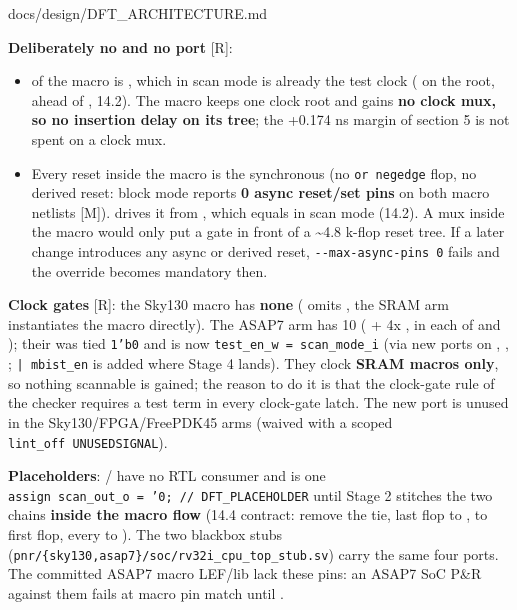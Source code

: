 \begin{relocated}{docs/design/DFT_ARCHITECTURE.md}
{}

\textbf{Deliberately no  and no  port}
{[}R{]}:

\begin{itemize}
\tightlist
\item
   of the macro is , which in scan mode
  is already the test clock ( on the 
  root, ahead of , 14.2). The macro keeps one clock root
  and gains \textbf{no clock mux, so no insertion delay on its tree};
  the +0.174 ns margin of section 5 is not spent on a clock mux.
\item
  Every reset inside the macro is the synchronous  (no
  \texttt{or\ negedge} flop, no derived reset:
   block mode reports \textbf{0 async
  reset/set pins} on both macro netlists {[}M{]}).  drives
  it from , which equals  in
  scan mode (14.2). A mux inside the macro would only put a gate in
  front of a \textasciitilde4.8 k-flop reset tree. If a later change
  introduces any async or derived reset,
  \texttt{-\allowbreak{}-\allowbreak{}max-\allowbreak{}async-\allowbreak{}pins\ 0}
  fails and the override becomes mandatory then.
\end{itemize}

\textbf{Clock gates} {[}R{]}: the Sky130 macro has \textbf{none}
( omits , the SRAM
arm instantiates the macro directly). The ASAP7 arm has 10
( + 4x , in each of  and
); their  was tied \texttt{1'b0} and is now
\texttt{test\_\allowbreak{}en\_\allowbreak{}w\ =\allowbreak{}\ scan\_\allowbreak{}mode\_\allowbreak{}i}
(via new  ports on ,
, ;
\texttt{|\ mbist\_\allowbreak{}en} is added where Stage 4 lands). They
clock \textbf{SRAM macros only}, so nothing scannable is gained; the
reason to do it is that the clock-gate rule of the checker requires a
test term in every clock-gate latch. The new port is unused in the
Sky130/\allowbreak{}FPGA/\allowbreak{}FreePDK45 arms (waived with a
scoped \texttt{lint\_\allowbreak{}off\ UNUSEDSIGNAL}).

\textbf{Placeholders}: / have no RTL
consumer and  is one
\texttt{assign\ scan\_\allowbreak{}out\_\allowbreak{}o\ =\allowbreak{}\ '0;\ /\allowbreak{}/\allowbreak{}\ DFT\_\allowbreak{}PLACEHOLDER}
until Stage 2 stitches the two chains \textbf{inside the macro flow}
(14.4 contract: remove the tie, last flop to ,
 to first flop, every  to
). The two blackbox stubs
(\texttt{pnr/\allowbreak{}\{sky130,\allowbreak{}asap7\}/\allowbreak{}soc/\allowbreak{}rv32i\_\allowbreak{}cpu\_\allowbreak{}top\_\allowbreak{}stub.\allowbreak{}sv})
carry the same four ports. The committed ASAP7 macro LEF/lib lack these
pins: an ASAP7 SoC P\&R against them fails at macro pin match until
.


\end{relocated}
